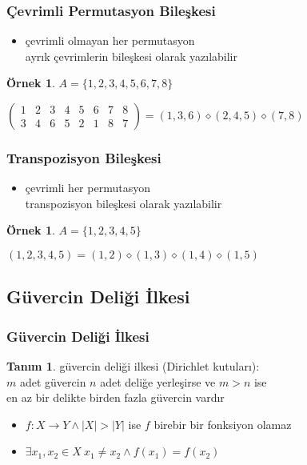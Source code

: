 \documentclass[dvipsnames]{beamer}
\theoremstyle{definition}
\newtheorem{tanim}[theorem]{Tanım}
\theoremstyle{example}
\newtheorem{ornek}[theorem]{Örnek}
\theoremstyle{plain}
\begin{document}
\begin{frame}
  \frametitle{Çevrimli Permutasyon Bileşkesi}

  \begin{itemize}
    \item çevrimli olmayan her permutasyon\\
      ayrık çevrimlerin bileşkesi olarak yazılabilir
  \end{itemize}

  \pause
  \begin{ornek}
    $A = \{1,2,3,4,5,6,7,8\}$

    \medskip
    $\left(
      \begin{array}{cccccccc}
        1 & 2 & 3 & 4 & 5 & 6 & 7 & 8\\
        3 & 4 & 6 & 5 & 2 & 1 & 8 & 7
      \end{array}
    \right) = (1,3,6) \diamond (2,4,5) \diamond (7,8)$
  \end{ornek}
\end{frame}

\begin{frame}
  \frametitle{Transpozisyon Bileşkesi}

  \begin{itemize}
    \item çevrimli her permutasyon\\
      transpozisyon bileşkesi olarak yazılabilir
  \end{itemize}

  \pause
  \begin{ornek}
    $A = \{1,2,3,4,5\}$

    \medskip
    $(1,2,3,4,5) = (1,2) \diamond (1,3) \diamond (1,4) \diamond (1,5)$
  \end{ornek}
\end{frame}

\subsection{Güvercin Deliği İlkesi}

\begin{frame}
  \frametitle{Güvercin Deliği İlkesi}

  \begin{tanim}
    \alert{güvercin deliği ilkesi} (Dirichlet kutuları):\\
    $m$ adet güvercin $n$ adet deliğe yerleşirse ve $m>n$ ise\\
    en az bir delikte birden fazla güvercin vardır
  \end{tanim}

  \pause
  \begin{itemize}
    \item $f: X \rightarrow Y \wedge |X|>|Y|$ ise $f$ birebir bir fonksiyon
      olamaz

    \item $\exists x_1,x_2 \in X~x_1 \neq x_2 \wedge f(x_1)=f(x_2)$
  \end{itemize}
\end{frame}
\end{document}
